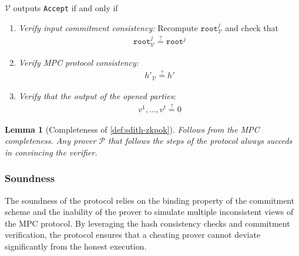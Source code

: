 \documentclass[11pt]{report}
\theoremstyle{definition}
\theoremstyle{plain}
\newtheorem{lemma}{Lemma}[section]
\begin{document}
\begin{protocol}
  $\mathcal{V}$ outputs \texttt{Accept} if and only if

  \begin{enumerate}[parsep=0pt, itemsep=0pt, topsep=0pt]
    \item \textit{Verify input commitment consistency:} Recompute $\texttt{root}^j_{\mathcal{V}}$ and check that
          \begin{align*}
            \texttt{root}^j_{\mathcal{V}} \stackrel{?}{=} \texttt{root}^j
          \end{align*}
    \item \textit{Verify MPC protocol consistency:}
          \begin{align*}
            h'_{\mathcal{V}} \stackrel{?}{=} h'
          \end{align*}
    \item \textit{Verify that the output of the opened parties}:
          \begin{align*}
            v^1, \dots, v^t \stackrel{?}{=} 0
          \end{align*}
  \end{enumerate}
\end{protocol}

\begin{lemma}[Completeness of \autoref{def:sdith-zkpok}]
  Follows from the MPC completeness. Any prover $\mathcal{P}$ that follows the steps of the protocol always succeds in convincing the verifier.
\end{lemma}

\subsubsection{Soundness}
The soundness of the protocol relies on the binding property of the commitment scheme and the inability of the prover to simulate multiple inconsistent views of the MPC protocol. By leveraging the hash consistency checks and commitment verification, the protocol ensures that a cheating prover cannot deviate significantly from the honest execution.
\end{document}
